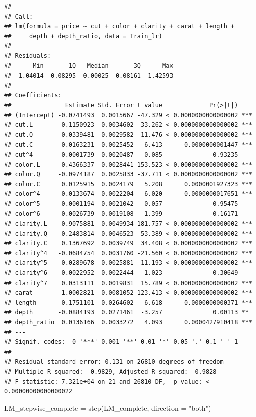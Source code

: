 \documentclass[
]{article}
\newenvironment{Shaded}{\begin{snugshade}}{\end{snugshade}}
\newcommand{\AttributeTok}[1]{\textcolor[rgb]{0.77,0.63,0.00}{#1}}
\newcommand{\FunctionTok}[1]{\textcolor[rgb]{0.00,0.00,0.00}{#1}}
\newcommand{\NormalTok}[1]{#1}
\newcommand{\OtherTok}[1]{\textcolor[rgb]{0.56,0.35,0.01}{#1}}
\newcommand{\StringTok}[1]{\textcolor[rgb]{0.31,0.60,0.02}{#1}}
\begin{document}
\begin{verbatim}
##
## Call:
## lm(formula = price ~ cut + color + clarity + carat + length +
##     depth + depth_ratio, data = Train_lr)
##
## Residuals:
##      Min       1Q   Median       3Q      Max
## -1.04014 -0.08295  0.00025  0.08161  1.42593
##
## Coefficients:
##               Estimate Std. Error t value             Pr(>|t|)
## (Intercept) -0.0741493  0.0015667 -47.329 < 0.0000000000000002 ***
## cut.L        0.1150923  0.0034602  33.262 < 0.0000000000000002 ***
## cut.Q       -0.0339481  0.0029582 -11.476 < 0.0000000000000002 ***
## cut.C        0.0163231  0.0025452   6.413      0.0000000001447 ***
## cut^4       -0.0001739  0.0020487  -0.085              0.93235
## color.L      0.4366337  0.0028441 153.523 < 0.0000000000000002 ***
## color.Q     -0.0974187  0.0025833 -37.711 < 0.0000000000000002 ***
## color.C      0.0125915  0.0024179   5.208      0.0000001927323 ***
## color^4      0.0133674  0.0022204   6.020      0.0000000017651 ***
## color^5      0.0001194  0.0021042   0.057              0.95475
## color^6      0.0026739  0.0019108   1.399              0.16171
## clarity.L    0.9075881  0.0049934 181.757 < 0.0000000000000002 ***
## clarity.Q   -0.2483814  0.0046523 -53.389 < 0.0000000000000002 ***
## clarity.C    0.1367692  0.0039749  34.408 < 0.0000000000000002 ***
## clarity^4   -0.0684754  0.0031760 -21.560 < 0.0000000000000002 ***
## clarity^5    0.0289678  0.0025881  11.193 < 0.0000000000000002 ***
## clarity^6   -0.0022952  0.0022444  -1.023              0.30649
## clarity^7    0.0313111  0.0019831  15.789 < 0.0000000000000002 ***
## carat        1.0002821  0.0081052 123.413 < 0.0000000000000002 ***
## length       0.1751101  0.0264602   6.618      0.0000000000371 ***
## depth       -0.0884193  0.0271461  -3.257              0.00113 **
## depth_ratio  0.0136166  0.0033272   4.093      0.0000427910418 ***
## ---
## Signif. codes:  0 '***' 0.001 '**' 0.01 '*' 0.05 '.' 0.1 ' ' 1
##
## Residual standard error: 0.131 on 26810 degrees of freedom
## Multiple R-squared:  0.9829, Adjusted R-squared:  0.9828
## F-statistic: 7.321e+04 on 21 and 26810 DF,  p-value: < 0.00000000000000022
\end{verbatim}

\begin{Shaded}
\begin{Highlighting}[]
\NormalTok{LM\_stepwise\_complete }\OtherTok{=} \FunctionTok{step}\NormalTok{(LM\_complete, }\AttributeTok{direction =} \StringTok{"both"}\NormalTok{)}
\end{Highlighting}
\end{Shaded}
\end{document}
